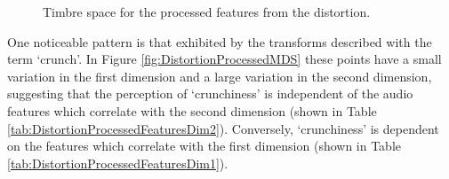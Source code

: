 		\begin{figure}[h!]
			\centering
			\qquad
			\caption{Timbre space for the processed features from the distortion.}
			\label{fig:DistortionProcessedMDSs}
		\end{figure}

		One noticeable pattern is that exhibited by the transforms described with the term `crunch'. In Figure
		\ref{fig:DistortionProcessedMDS} these points have a small variation in the first dimension and a large
		variation in the second dimension, suggesting that the perception of `crunchiness' is independent of the
		audio features which correlate with the second dimension (shown in Table
		\ref{tab:DistortionProcessedFeaturesDim2}). Conversely, `crunchiness' is dependent on the features which
		correlate with the first dimension (shown in Table \ref{tab:DistortionProcessedFeaturesDim1}).


